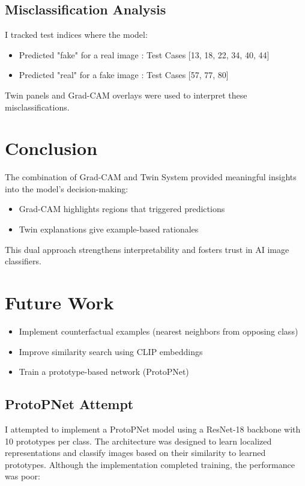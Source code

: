 \documentclass{article}
\begin{document}
\subsection{Misclassification Analysis}
I tracked test indices where the model:
\begin{itemize}
    \item Predicted "fake" for a real image : Test Cases [13, 18, 22, 34, 40, 44]
    \item Predicted "real" for a fake image  : Test Cases [57, 77, 80]
\end{itemize}

Twin panels and Grad-CAM overlays were used to interpret these misclassifications.

\section{Conclusion}
The combination of Grad-CAM and Twin System provided meaningful insights into the model's decision-making:
\begin{itemize}
    \item Grad-CAM highlights regions that triggered predictions
    \item Twin explanations give example-based rationales
\end{itemize}

This dual approach strengthens interpretability and fosters trust in AI image classifiers.

\section{Future Work}
\begin{itemize}
    \item Implement counterfactual examples (nearest neighbors from opposing class)
    \item Improve similarity search using CLIP embeddings
    \item Train a prototype-based network (ProtoPNet)
\end{itemize}

\subsection*{ProtoPNet Attempt}
I attempted to implement a ProtoPNet model using a ResNet-18 backbone with 10 prototypes per class. The architecture was designed to learn localized representations and classify images based on their similarity to learned prototypes. Although the implementation completed training, the performance was poor:
\end{document}
